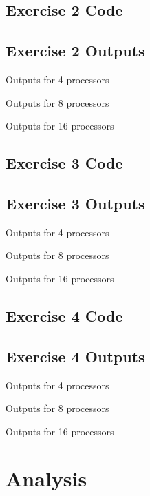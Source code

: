 \documentclass{report}
\begin{document}
\subsection{Exercise 2 Code}


\subsection{Exercise 2 Outputs}
Outputs for 4 processors


Outputs for 8 processors


Outputs for 16 processors



\subsection{Exercise 3 Code}


\subsection{Exercise 3 Outputs}
Outputs for 4 processors


Outputs for 8 processors


Outputs for 16 processors



\subsection{Exercise 4 Code}


\subsection{Exercise 4 Outputs}
Outputs for 4 processors


Outputs for 8 processors


Outputs for 16 processors



\section{Analysis}
\end{document}
